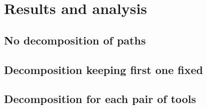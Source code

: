 \chapter{Results and analysis}\label{chap:results_analysis_wf}

\section{No decomposition of paths}

\section{Decomposition keeping first one fixed}

\section{Decomposition for each pair of tools}